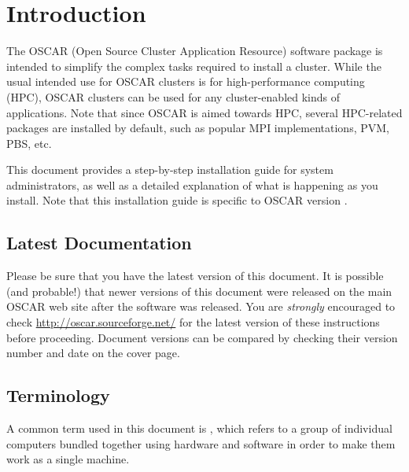 %
% 
%
%
%

\section{Introduction}

The OSCAR (Open Source Cluster Application Resource) software package
is intended to simplify the complex tasks required to install a
cluster.  While the usual intended use for OSCAR clusters is for
high-performance computing (HPC), OSCAR clusters can be used for any
cluster-enabled kinds of applications.  Note that since OSCAR is aimed
towards HPC, several HPC-related packages are installed by default,
such as popular MPI implementations, PVM, PBS, etc.

This document provides a step-by-step installation guide for system
administrators, as well as a detailed explanation of what is happening
as you install.  Note that this installation guide is specific to
OSCAR version \oscarversion.  


\subsection{Latest Documentation}

Please be sure that you have the latest version of this document.  It
is possible (and probable!) that newer versions of this document were
released on the main OSCAR web site after the software was released.
You are {\em strongly} encouraged to check
\url{http://oscar.sourceforge.net/} for the latest version of these
instructions before proceeding.  Document versions can be compared by
checking their version number and date on the cover page.


\subsection{Terminology}

A common term used in this document is , which refers to
a group of individual computers bundled together using hardware and
software in order to make them work as a single machine.

